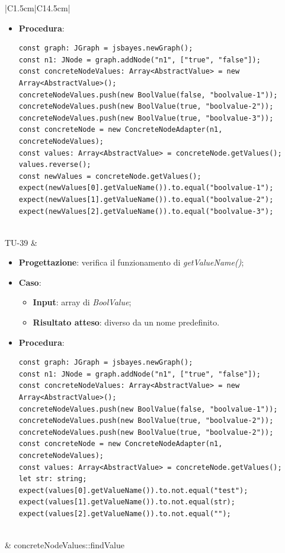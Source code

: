 \begin{longtable}{|C{1.5cm}|C{14.5cm}|}
\begin{itemize}
		\item \textbf{Procedura}:
		\begin{lstlisting}
const graph: JGraph = jsbayes.newGraph();
const n1: JNode = graph.addNode("n1", ["true", "false"]);
const concreteNodeValues: Array<AbstractValue> = new Array<AbstractValue>();
concreteNodeValues.push(new BoolValue(false, "boolvalue-1"));
concreteNodeValues.push(new BoolValue(true, "boolvalue-2"));
concreteNodeValues.push(new BoolValue(true, "boolvalue-3"));
const concreteNode = new ConcreteNodeAdapter(n1, concreteNodeValues);
const values: Array<AbstractValue> = concreteNode.getValues();
values.reverse();
const newValues = concreteNode.getValues();
expect(newValues[0].getValueName()).to.equal("boolvalue-1");
expect(newValues[1].getValueName()).to.equal("boolvalue-2");
expect(newValues[2].getValueName()).to.equal("boolvalue-3");
		\end{lstlisting}
	\end{itemize}\\
	\hline
	{TU-39} &
	\begin{itemize}
		\item \textbf{Progettazione}: verifica il funzionamento di \emph{getValueName()};
		\item \textbf{Caso}: 
		\begin{itemize}
			\item \textbf{Input}: array di \emph{BoolValue};
			\item \textbf{Risultato atteso}: diverso da un nome predefinito.
		\end{itemize}
		\item \textbf{Procedura}:
		\begin{lstlisting}
const graph: JGraph = jsbayes.newGraph();
const n1: JNode = graph.addNode("n1", ["true", "false"]);
const concreteNodeValues: Array<AbstractValue> = new Array<AbstractValue>();
concreteNodeValues.push(new BoolValue(false, "boolvalue-1"));
concreteNodeValues.push(new BoolValue(true, "boolvalue-2"));
concreteNodeValues.push(new BoolValue(true, "boolvalue-2"));
const concreteNode = new ConcreteNodeAdapter(n1, concreteNodeValues);
const values: Array<AbstractValue> = concreteNode.getValues();
let str: string;
expect(values[0].getValueName()).to.not.equal("test");
expect(values[1].getValueName()).to.not.equal(str);
expect(values[2].getValueName()).to.not.equal("");
		\end{lstlisting}
	\end{itemize}\\
	\hline
	 & concreteNodeValues::findValue\\

\end{longtable}
